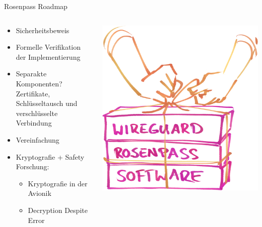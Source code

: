 \documentclass{rosenpass-beamer}
\begin{document}
\begin{frame}{Rosenpass Roadmap}
\begin{columns}[c]
\begin{column}{0.7\textwidth}
\begin{itemize}
  \item Sicherheitsbeweis
  \item Formelle Verifikation der Implementierung
  \item Separakte Komponenten? Zertifikate, Schlüsseltausch und verschlüsselte Verbindung
  \item Vereinfachung

  \item  Kryptografie + Safety Forschung:
  \begin{itemize}
    \item Kryptografie in der Avionik
    \item Decryption Despite Error
  \end{itemize}
\end{itemize}
\end{column}

\begin{column}{0.2\textwidth}
\includegraphics[width=\linewidth]{graphics/rosenpass in anderen apps.png}


\end{column}
\end{columns}
\end{frame}
\end{document}

